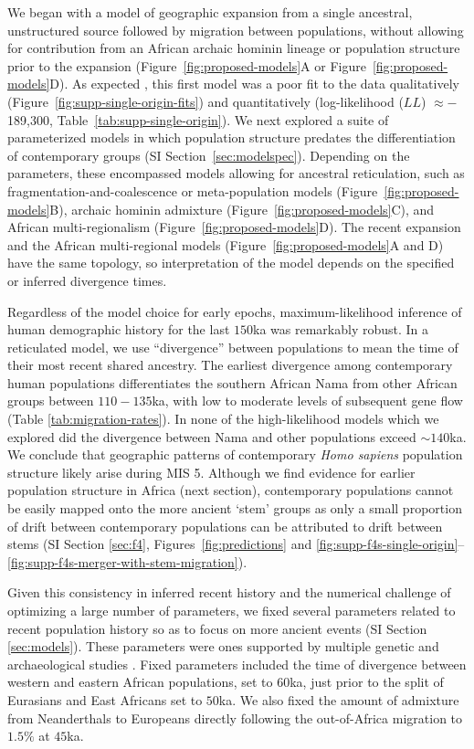 \documentclass[]{article}
\begin{document}
We began with a model of geographic expansion from a single ancestral,
unstructured source followed by migration between populations, without allowing
for contribution from an African archaic hominin lineage or population
structure prior to the expansion (Figure~\ref{fig:proposed-models}A or
Figure~\ref{fig:proposed-models}D). As expected \citep{Ragsdale2019-nt}, this
first model was a poor fit to the data qualitatively
(Figure~\ref{fig:supp-single-origin-fits}) and quantitatively (log-likelihood
($LL$) $\approx-$189,300, Table~\ref{tab:supp-single-origin}). We next explored
a suite of parameterized models in which population structure predates the
differentiation of contemporary groups (SI Section~\ref{sec:modelspec}).
Depending on the parameters, these encompassed models allowing for ancestral
reticulation, such as fragmentation-and-coalescence or meta-population models
(Figure~\ref{fig:proposed-models}B), archaic hominin admixture
(Figure~\ref{fig:proposed-models}C), and African multi-regionalism
(Figure~\ref{fig:proposed-models}D). The recent expansion and the African
multi-regional models (Figure~\ref{fig:proposed-models}A and D) have the same
topology, so interpretation of the model depends on the specified or inferred
divergence times.

Regardless of the model choice for early epochs, maximum-likelihood inference
of human demographic history for the last $150$ka was remarkably robust.  In a
reticulated model, we use ``divergence'' between populations to mean the time
of their most recent shared ancestry. The earliest divergence among
contemporary human populations differentiates the southern African Nama from
other African groups between $110-135$ka, with low to moderate levels of
subsequent gene flow (Table \ref{tab:migration-rates}). In none of the
high-likelihood models which we explored did the divergence between Nama and
other populations exceed $\sim140$ka. We conclude that geographic patterns of
contemporary \emph{Homo sapiens} population structure likely arise during MIS
5. Although we find evidence for earlier population structure in Africa (next
section), contemporary populations cannot be easily mapped onto the more
ancient `stem' groups as only a small proportion of drift between contemporary
populations can be attributed to drift between stems (SI Section \ref{sec:f4},
Figures~\ref{fig:predictions} and
\ref{fig:supp-f4s-single-origin}--\ref{fig:supp-f4s-merger-with-stem-migration}).

Given this consistency in inferred recent history and the numerical challenge
of optimizing a large number of parameters, we fixed several parameters related
to recent population history so as to focus on more ancient events (SI Section
\ref{sec:models}). These parameters were ones supported by multiple genetic and
archaeological studies \citep{Bergstrom2021-iw}.  Fixed parameters included the
time of divergence between western and eastern African populations, set to
$60$ka, just prior to the split of Eurasians and East Africans set to $50$ka.
We also fixed the amount of admixture from Neanderthals to Europeans directly
following the out-of-Africa migration to $1.5\%$ at $45$ka.
\end{document}
